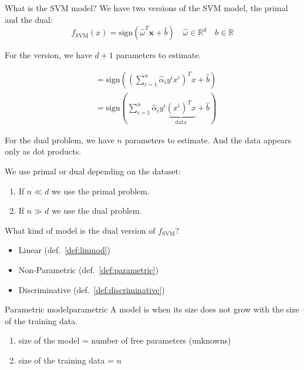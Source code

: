 \begin{question}{What is the SVM model?}{}
	We have two versions of the SVM model, the primal and the dual:
	\begin{equation*}
		f_\text{SVM}(x) = \text{sign} \left( \hat{\omega}^T \boldsymbol{x} + \hat{b} \right)
		\quad \hat\omega \in \mathds{R}^d
		\quad b \in \mathds{R}
		\tag{PRIMAL}
	\end{equation*}

	For the  version, we have $d+1$ parameters to estimate.

	\begin{align*}
		 & = \text{sign} \left( \left(\sum_{i=1}^n \hat\alpha_i y^i x^i \right)^T x + \hat{b} \right) \\
		 & = \text{sign} \left( \sum_{i=1}^n \hat\alpha_i y^i
		\underbrace{(x^i)^T x}_{\text{data}} + \hat{b} \right)
		\tag{DUAL}
	\end{align*}

	For the dual problem, we have $n$ parameters to estimate.
	And the data appears only as dot products.

	\vspace{0.5em}
	We use primal or dual depending on the dataset:
	\begin{enumerate}
		\item If $n \ll d$ we use the primal problem.
		\item If $n \gg d$ we use the dual problem.
	\end{enumerate}
\end{question}

\begin{question}{What kind of model is the dual version of $f_\text{SVM}$?}{}
	\begin{itemize}
		\item Linear (def.~\ref{def:linmod})
		\item Non-Parametric (def.~\ref{def:parametric})
		\item Discriminative (def.~\ref{def:discriminative})
	\end{itemize}
\end{question}

\begin{definition}{Parametric model}{parametric}
	A model is  when its size does not
	grow with the size of the training data.
	\begin{enumerate}
		\item size of the model = number of free parameters (unknowns)
		\item size of the training data = $n$
	\end{enumerate}
\end{definition}

